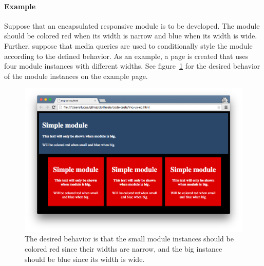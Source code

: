 \documentclass[a4paper,11pt]{kth-mag}
\begin{document}
        \paragraph{Example}
        Suppose that an \gls{encapsulated} \gls{responsive} module is to be developed.
        The module should be colored red when its width is narrow and blue when its width is wide.
        Further, suppose that \gls{media queries} are used to conditionally style the module according to the defined behavior.
        As an example, a page is created that uses four module instances with different widths.
        See figure~\ref{fig:problem-eq} for the desired behavior of the module instances on the example page.
        \begin{figure}[ht]
          \centering
          \begin{minipage}{.5\textwidth}
            \centering
            \includegraphics[width=\linewidth]{images/eq-big}
          \end{minipage}%
          \caption{
            The desired behavior is that the small module instances should be colored red since their widths are narrow, and the big instance should be blue since its width is wide.
          }
          \label{fig:problem-eq}
        \end{figure}
\end{document}
